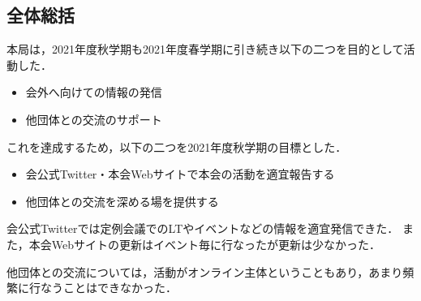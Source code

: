 \subsection*{全体総括}


本局は，2021年度秋学期も2021年度春学期に引き続き以下の二つを目的として活動した．
\begin{itemize}
    \item 会外へ向けての情報の発信
    \item 他団体との交流のサポート
\end{itemize}
これを達成するため，以下の二つを2021年度秋学期の目標とした．
\begin{itemize}
    \item 会公式Twitter・本会Webサイトで本会の活動を適宜報告する
    \item 他団体との交流を深める場を提供する
\end{itemize}

会公式Twitterでは定例会議でのLTやイベントなどの情報を適宜発信できた．
また，本会Webサイトの更新はイベント毎に行なったが更新は少なかった．

他団体との交流については，活動がオンライン主体ということもあり，あまり頻繁に行なうことはできなかった．
